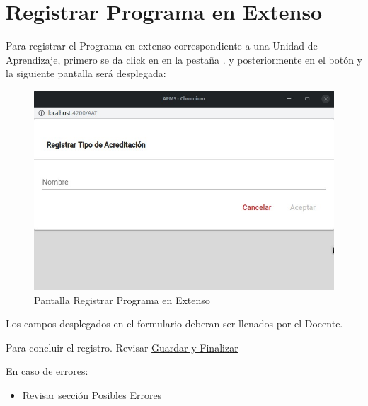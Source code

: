 \section{Registrar Programa en Extenso}

Para registrar el Programa en extenso correspondiente a una Unidad de Aprendizaje, primero se da click en en la pestaña . y posteriormente en el botón  y la siguiente pantalla será desplegada:

\begin{figure}[!hbtp]
    \centering
    \hypertarget{9}{\includegraphics[width=0.5\linewidth]{images/SP6/9.jpeg}}
    \caption{Pantalla Registrar Programa en Extenso}
\end{figure}

Los campos desplegados en el formulario deberan ser llenados por el Docente.

Para concluir el registro. Revisar \hyperlink{GuardarFinalizar}{Guardar y Finalizar}

En caso de errores: 
    \begin{itemize}
        \item Revisar sección \hyperlink{Errores}{Posibles Errores}
    \end{itemize}
